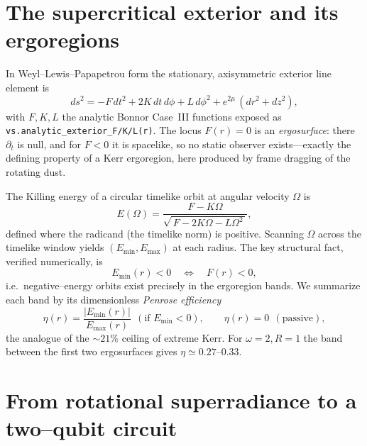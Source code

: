 \documentclass[11pt]{article}
\newcommand{\Emin}{E_{\min}}
\newcommand{\Emax}{E_{\max}}
\newcommand{\code}[1]{\texttt{\small #1}}
\begin{document}
\section{The supercritical exterior and its ergoregions}

In Weyl--Lewis--Papapetrou form the stationary, axisymmetric exterior line element is
\begin{equation}
ds^2 = -F\,dt^2 + 2K\,dt\,d\phi + L\,d\phi^2 + e^{2\mu}\,(dr^2+dz^2),
\end{equation}
with $F,K,L$ the analytic Bonnor Case~III functions exposed as
\code{vs.analytic\_exterior\_F/K/L(r)}. The locus $F(r)=0$ is an \emph{ergosurface}: there
$\partial_t$ is null, and for $F<0$ it is spacelike, so no static observer exists---exactly the
defining property of a Kerr ergoregion, here produced by frame dragging of the rotating dust.

The Killing energy of a circular timelike orbit at angular velocity $\Omega$ is
\begin{equation}
E(\Omega) = \frac{F-K\Omega}{\sqrt{\,F-2K\Omega-L\Omega^2\,}},
\label{eq:orbitE}
\end{equation}
defined where the radicand (the timelike norm) is positive. Scanning $\Omega$ across the
timelike window yields $(\Emin,\Emax)$ at each radius. The key structural fact, verified
numerically, is
\begin{equation}
\Emin(r)<0 \quad\Longleftrightarrow\quad F(r)<0,
\end{equation}
i.e.\ negative--energy orbits exist precisely in the ergoregion bands. We summarize each band by
its dimensionless \emph{Penrose efficiency}
\begin{equation}
\eta(r) = \frac{|\Emin(r)|}{\Emax(r)}\ \ (\text{if }\Emin<0),\qquad \eta(r)=0\ \ (\text{passive}),
\end{equation}
the analogue of the $\sim21\%$ ceiling of extreme Kerr. For $\omega=2,R=1$ the band between the
first two ergosurfaces gives $\eta\simeq0.27$--$0.33$.

\section{From rotational superradiance to a two--qubit circuit}
\label{sec:circuit}
\end{document}
